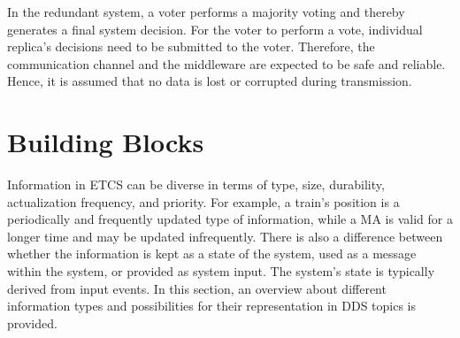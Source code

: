 In the redundant system, a voter performs a majority voting and thereby generates a final system decision.
For the voter to perform a vote, individual replica's decisions need to be submitted to the voter.
Therefore, the communication channel and the  middleware are expected to be safe and reliable.
Hence, it is assumed that no data is lost or corrupted during transmission.

\section{ Building Blocks}

Information in \gls*{ETCS} can be diverse in terms of type, size, durability, actualization frequency, and priority.
For example, a train's position is a periodically and frequently updated type of information, while a \gls*{MA} is valid for a longer time and may be updated infrequently.
There is also a difference between whether the information is kept as a state of the system, used as a message within the system, or provided as system input.
The system's state is typically derived from input events.
In this section, an overview about different information types and possibilities for their representation in \gls*{DDS} topics is provided.


